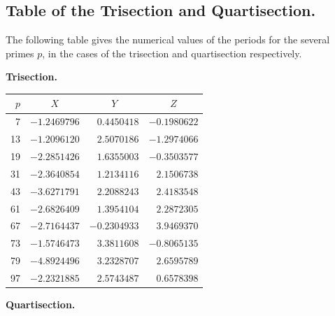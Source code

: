 \documentclass[12pt,a4paper]{article}
\theoremstyle{plain}
\begin{document}
\newpage
\subsection*{Table of the Trisection and Quartisection.}

The following table gives the numerical values of the periods for the
several primes $p$, in the cases of the trisection and quartisection respectively.

\begin{center}
\textbf{Trisection.}
\end{center}

\begin{center}
\begin{tabular}{r|rrr}
\toprule
$p$ & \multicolumn{1}{c}{$X$} & \multicolumn{1}{c}{$Y$} & \multicolumn{1}{c}{$Z$} \\
\midrule
7  & $-1.2469796$ & $0.4450418$ & $-0.1980622$ \\
13 & $-1.2096120$ & $2.5070186$ & $-1.2974066$ \\
19 & $-2.2851426$ & $1.6355003$ & $-0.3503577$ \\
31 & $-2.3640854$ & $1.2134116$ & $2.1506738$ \\
43 & $-3.6271791$ & $2.2088243$ & $2.4183548$ \\
61 & $-2.6826409$ & $1.3954104$ & $2.2872305$ \\
67 & $-2.7164437$ & $-0.2304933$ & $3.9469370$ \\
73 & $-1.5746473$ & $3.3811608$ & $-0.8065135$ \\
79 & $-4.8924496$ & $3.2328707$ & $2.6595789$ \\
97 & $-2.2321885$ & $2.5743487$ & $0.6578398$ \\
\bottomrule
\end{tabular}
\end{center}

\begin{center}
\textbf{Quartisection.}
\end{center}
\end{document}
